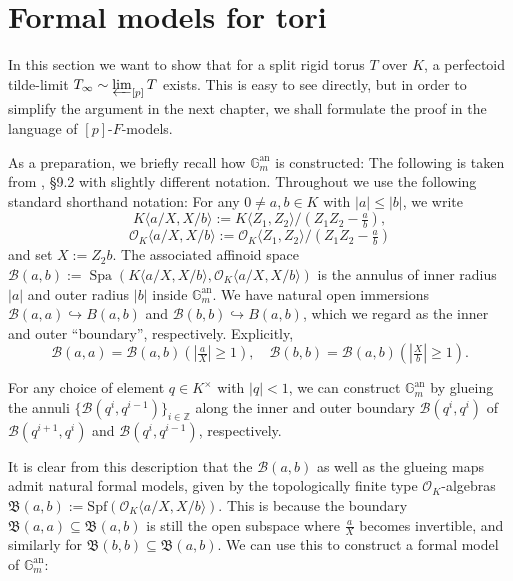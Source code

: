 \documentclass[10pt,oneside]{amsart}
\theoremstyle{definition}
\begin{document}
 
 
	
 
	
		



	\section{Formal models for tori}
	
	In this section we want to show that for a split rigid torus $T$ over $K$, a perfectoid tilde-limit $T_\infty\sim \varprojlim_{[p]}T$ exists. This is easy to see directly, but in order to simplify the argument in the next chapter, we shall formulate the proof in the language of $[p]$-$F$-models.
	
	
	As a preparation, we briefly recall how $\mathbb G_m^{\operatorname{an}}$ is constructed: The following is taken from \cite{Boschlectures}, \S 9.2 with slightly different notation. Throughout we use the following standard shorthand notation: For any $0\ne a,b\in K$ with $|a|\leq |b|$, we write
	\[K\langle a/X,X/b\rangle := K\langle Z_1,Z_2\rangle/(Z_1Z_2-\tfrac{a}{b}),\]
	\[\mathcal O_K\langle a/X,X/b\rangle:=\mathcal O_K\langle Z_1,Z_2 \rangle/(Z_1Z_2-\tfrac{a}{b})\]
	and set $X:=Z_2b$.
	The associated affinoid space $\mathcal B(a,b):=\operatorname{Spa}(K\langle a/X, X/b\rangle, \mathcal O_K\langle  a/X,X/b \rangle)$ is the annulus of inner radius $|a|$ and outer radius $|b|$ inside $\mathbb G_m^{\operatorname{an}}$.
	We have natural open immersions $\mathcal B(a,a)\hookrightarrow B(a,b)$ and $\mathcal B(b,b)\hookrightarrow B(a,b)$, which we regard as the inner and outer ``boundary'', respectively. Explicitly, \[\mathcal B(a,a)=\mathcal B(a,b)(|\tfrac{a}{X}|\geq 1),\quad \mathcal B(b,b)=\mathcal B(a,b)(|\tfrac{X}{b}|\geq 1).\]
	
	
	
	For any choice of element $q\in K^\times$ with $|q|<1$, we can construct $\mathbb G_m^{\mathrm{an}}$ by glueing the annuli $\{\mathcal B(q^i,q^{i-1})\}_{i\in\mathbb{Z}}$ along the inner and outer boundary $\mathcal B(q^i,q^i)$ of $\mathcal  B(q^{i+1},q^{i})$ and $\mathcal B(q^{i}, q^{i-1})$, respectively.
	
	It is clear from this description that the $\mathcal B(a,b)$ as well as the glueing maps admit natural formal models, given by the topologically finite type $\mathcal O_K$-algebras $\mathfrak B(a,b):=\mathrm{Spf}(\mathcal O_K\langle  a/X,X/b \rangle).$
	This is because the boundary $\mathfrak B(a,a)\subseteq \mathfrak B(a,b)$ is still the open subspace where $\tfrac{a}{X}$ becomes invertible, and similarly for  $\mathfrak B(b,b)\subseteq \mathfrak B(a,b)$. We can use this to construct a formal model of $\mathbb G_m^{\mathrm{an}}$:
\end{document}
